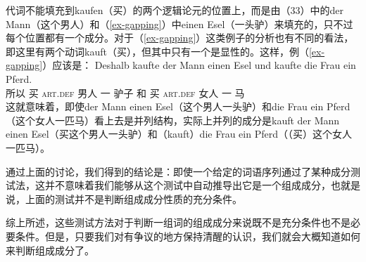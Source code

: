 \eal
{}
\zl
代词不能填充到kaufen（买）的两个逻辑论元的位置上，而是由（33）中的der Mann（这个男人）和（\ref{ex-gapping}）中einen Esel（一头驴）来填充的，只不过每个位置都有一个成分。对于（\ref{ex-gapping}）这类例子的分析也有不同的看法，即这里有两个动词kauft（买），但其中只有一个是显性的\citep{Crysmann2003c}。这样，例（\ref{ex-gapping}）应该是：
\ea
\gll Deshalb kaufte der Mann einen Esel und kaufte die Frau ein Pferd.\\
	所以 买 \textsc{art}.\textsc{def} 男人 一 驴子 和 买 \textsc{art}.\textsc{def} 女人 一 马\\
\z
这就意味着，即使der Mann einen Esel（这个男人一头驴）和die Frau ein Pferd（这个女人一匹马）看上去是并列结构，实际上并列的成分是kauft der Mann einen Esel（买这个男人一头驴）和（kauft）die Frau ein Pferd（（买）这个女人一匹马）。

通过上面的讨论，我们得到的结论是：即使一个给定的词语序列通过了某种成分测试法，这并不意味着我们能够从这个测试中自动推导出它是一个组成成分，也就是说，上面的测试并不是判断组成成分性质的充分条件。

综上所述，这些测试方法对于判断一组词的组成成分来说既不是充分条件也不是必要条件。但是，只要我们对有争议的地方保持清醒的认识，我们就会大概知道如何来判断组成成分了。

